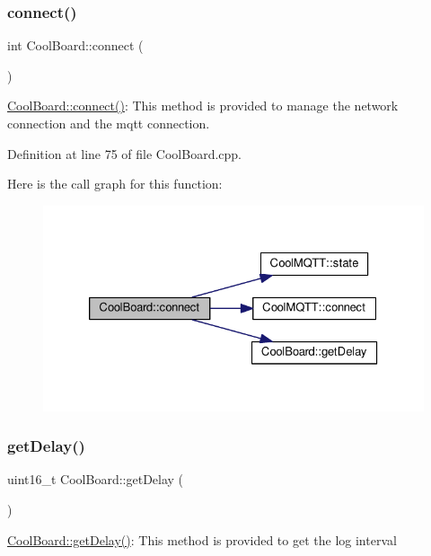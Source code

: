 \subsubsection{\texorpdfstring{connect()}{connect()}}
{\footnotesize\ttfamily int Cool\+Board\+::connect (\begin{DoxyParamCaption}{ }\end{DoxyParamCaption})}

\hyperlink{class_cool_board_a519de78b807f8ec6463ff484eb925918}{Cool\+Board\+::connect()}\+: This method is provided to manage the network connection and the mqtt connection. 

Definition at line 75 of file Cool\+Board.\+cpp.

Here is the call graph for this function\+:\nopagebreak
\begin{figure}[H]
\begin{center}
\leavevmode
\includegraphics[width=326pt]{class_cool_board_a519de78b807f8ec6463ff484eb925918_cgraph}
\end{center}
\end{figure}
\mbox{\label{class_cool_board_a12c3b5fa0ee6cc2c7d397abfc78f0f43}} 
\subsubsection{\texorpdfstring{get\+Delay()}{getDelay()}}
{\footnotesize\ttfamily uint16\+\_\+t Cool\+Board\+::get\+Delay (\begin{DoxyParamCaption}{ }\end{DoxyParamCaption})}

\hyperlink{class_cool_board_a12c3b5fa0ee6cc2c7d397abfc78f0f43}{Cool\+Board\+::get\+Delay()}\+: This method is provided to get the log interval 

